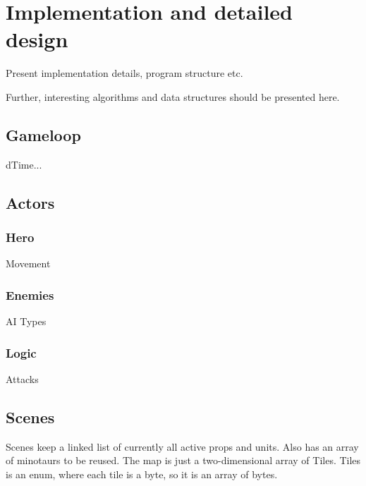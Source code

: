 \chapter{Implementation and detailed design}

Present implementation details, program structure etc.

Further, interesting algorithms and data structures should be presented here.

\section{Gameloop}
dTime...

\section{Actors}
\subsection{Hero}
Movement
\subsection{Enemies}
AI
Types

\subsection{Logic}
Attacks

\section{Scenes}
Scenes keep a linked list of currently all active props and units.
Also has an array of minotaurs to be reused.
The map is just a two-dimensional array of Tiles. Tiles is an enum, where each tile is a byte, so it is an array of bytes.
